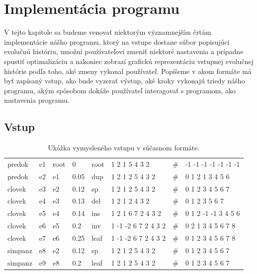 \chapter{Implementácia programu}
V tejto kapitole sa budeme venovať niektorým významnejším črtám implementácie nášho programu, ktorý na vstupe dostane súbor popisujúci evolučnú históriu,
umožní používateľovi zmeniť niektoré nastavenia a prípadne spustiť optimalizáciu a nakoniec zobrazí grafickú reprezentáciu vstupnej evolučnej histórie podľa
toho, aké zmeny vykonal používateľ. Popíšeme v akom formáte má byť zapísaný vstup,
ako bude vyzerať výstup, aké kroky vykonajú triedy nášho programu,
akým spôsobom dokáže používateľ interagovať s programom,
ako nastavenia programu.
\section{Vstup}
\label{sec:vstup}

\begin{table}[!htb]

\begin{center}
\begin{tabular}{llllllll}
predok & e1 & root & 0 & root & 1 2 1 5 4 3 2 & \#  & -1 -1 -1 -1 -1 -1 -1 \\
predok & e2 & e1 &  0.05 & dup &  1 2 1 2 5 4 3 2 & \# & 0 1 2 1 3 4 5 6 \\
clovek & e3 & e2 &  0.12 & sp &   1 2 1 2 5 4 3 2 & \# & 0 1 2 3 4 5 6 7 \\
clovek & e4 & e3 &  0.13 & del & 1 2 1 2 4 3 2 & \# & 0 1 2 3 5 6 7 \\
clovek & e5 & e4 &  0.14 & ins & 1 2 1 6 7 2 4 3 2 & \# & 0 1 2 -1 -1 3 4 5 6 \\
clovek &  e6 & e5 &  0.2 & inv &  1 -1 -2 6 7 2 4 3 2 & \# & 0 2 1 3 4 5 6 7 8 \\
clovek & e7 & e6 &  0.25 & leaf & 1 -1 -2 6 7 2 4 3 2 & \# & 0 1 2 3 4 5 6 7 8 \\
simpanz & e8 & e2  & 0.12 & sp &  1 2 1 2 5 4 3 2 & \# & 0 1 2 3 4 5 6 7 \\
simpanz & e9 & e8 &  0.2 & leaf & 1 2 1 2 5 4 3 2 & \# & 0 1 2 3 4 5 6 7 \\
 \end{tabular}

\end{center}
\caption{Ukážka vymysleného vstupu v súčasnom formáte.}\label{tab:vstup}
\end{table}

